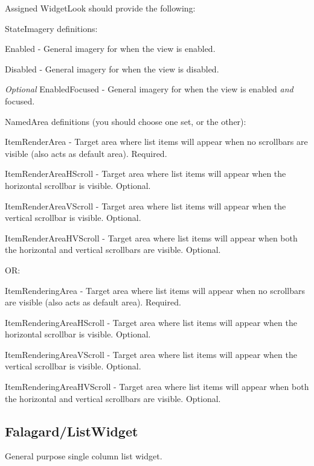 Assigned Widget\+Look should provide the following\+: 
\begin{DoxyItemize}
\item State\+Imagery definitions\+: 
\begin{DoxyItemize}
\item Enabled -\/ General imagery for when the view is enabled. 
\item Disabled -\/ General imagery for when the view is disabled. 
\item {\itshape Optional} Enabled\+Focused -\/ General imagery for when the view is enabled {\itshape and} focused. 
\end{DoxyItemize}


\item Named\+Area definitions (you should choose one set, or the other)\+: 
\begin{DoxyItemize}
\item Item\+Render\+Area -\/ Target area where list items will appear when no scrollbars are visible (also acts as default area). Required. 
\item Item\+Render\+Area\+H\+Scroll -\/ Target area where list items will appear when the horizontal scrollbar is visible. Optional. 
\item Item\+Render\+Area\+V\+Scroll -\/ Target area where list items will appear when the vertical scrollbar is visible. Optional. 
\item Item\+Render\+Area\+H\+V\+Scroll -\/ Target area where list items will appear when both the horizontal and vertical scrollbars are visible. Optional. 
\end{DoxyItemize}
\item OR\+: 
\begin{DoxyItemize}
\item Item\+Rendering\+Area -\/ Target area where list items will appear when no scrollbars are visible (also acts as default area). Required. 
\item Item\+Rendering\+Area\+H\+Scroll -\/ Target area where list items will appear when the horizontal scrollbar is visible. Optional. 
\item Item\+Rendering\+Area\+V\+Scroll -\/ Target area where list items will appear when the vertical scrollbar is visible. Optional. 
\item Item\+Rendering\+Area\+H\+V\+Scroll -\/ Target area where list items will appear when both the horizontal and vertical scrollbars are visible. Optional. 
\end{DoxyItemize}
\end{DoxyItemize}\hypertarget{fal_wr_ref_fal_wr_ref_sec_7}{}\subsection{Falagard/\+List\+Widget}\label{fal_wr_ref_fal_wr_ref_sec_7}
General purpose single column list widget.

